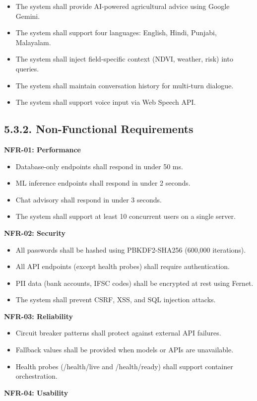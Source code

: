 \documentclass[12pt, a4paper]{report}
\begin{document}
\begin{itemize}[leftmargin=*]
  \item The system shall provide AI-powered agricultural advice using Google Gemini.
  \item The system shall support four languages: English, Hindi, Punjabi, Malayalam.
  \item The system shall inject field-specific context (NDVI, weather, risk) into queries.
  \item The system shall maintain conversation history for multi-turn dialogue.
  \item The system shall support voice input via Web Speech API.
\end{itemize}
\subsection{5.3.2. Non-Functional Requirements}
\textbf{NFR-01: Performance}

\begin{itemize}[leftmargin=*]
  \item Database-only endpoints shall respond in under 50 ms.
  \item ML inference endpoints shall respond in under 2 seconds.
  \item Chat advisory shall respond in under 3 seconds.
  \item The system shall support at least 10 concurrent users on a single server.
\end{itemize}
\textbf{NFR-02: Security}

\begin{itemize}[leftmargin=*]
  \item All passwords shall be hashed using PBKDF2-SHA256 (600,000 iterations).
  \item All API endpoints (except health probes) shall require authentication.
  \item PII data (bank accounts, IFSC codes) shall be encrypted at rest using Fernet.
  \item The system shall prevent CSRF, XSS, and SQL injection attacks.
\end{itemize}
\textbf{NFR-03: Reliability}

\begin{itemize}[leftmargin=*]
  \item Circuit breaker patterns shall protect against external API failures.
  \item Fallback values shall be provided when models or APIs are unavailable.
  \item Health probes (/health/live and /health/ready) shall support container orchestration.
\end{itemize}
\textbf{NFR-04: Usability}
\end{document}
